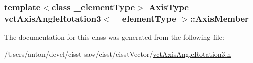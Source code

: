 \subsubsection[{Axis\+Member}]{\setlength{\rightskip}{0pt plus 5cm}template$<$class \+\_\+element\+Type$>$ {\bf Axis\+Type} {\bf vct\+Axis\+Angle\+Rotation3}$<$ \+\_\+element\+Type $>$\+::Axis\+Member\hspace{0.3cm}{\ttfamily [protected]}}\label{classvct_axis_angle_rotation3_ae73a683f2aff0496ec2d15176c357d83}


The documentation for this class was generated from the following file\+:\begin{DoxyCompactItemize}
\item 
/\+Users/anton/devel/cisst-\/saw/cisst/cisst\+Vector/\hyperlink{vct_axis_angle_rotation3_8h}{vct\+Axis\+Angle\+Rotation3.\+h}\end{DoxyCompactItemize}
